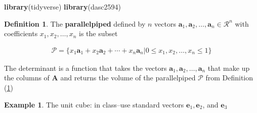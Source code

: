 \documentclass[
]{book}
\newenvironment{Shaded}{\begin{snugshade}}{\end{snugshade}}
\newcommand{\KeywordTok}[1]{\textcolor[rgb]{0.13,0.29,0.53}{\textbf{#1}}}
\newcommand{\NormalTok}[1]{#1}
\theoremstyle{definition}
\newtheorem{definition}{Definition}[chapter]
\theoremstyle{definition}
\newtheorem{example}{Example}[chapter]
\theoremstyle{definition}
\theoremstyle{definition}
\theoremstyle{remark}
\begin{document}
\begin{Shaded}
\begin{Highlighting}[]
\KeywordTok{library}\NormalTok{(tidyverse)}
\KeywordTok{library}\NormalTok{(dasc2594)}
\end{Highlighting}
\end{Shaded}

\begin{definition}
\protect\hypertarget{def:parallelpiped}{}\label{def:parallelpiped}The \textbf{parallelpiped} defined by \(n\) vectors \(\mathbf{a}_1, \mathbf{a}_2, \ldots, \mathbf{a}_n \in \mathcal{R}^n\) with coefficients \(x_1, x_2, \ldots, x_n\) is the subset

\[
\begin{aligned}
\mathcal{P} = \{x_1 \mathbf{a}_1 + x_2 \mathbf{a}_2 + \cdots + x_n \mathbf{a}_n | 0 \leq x_1, x_2, \ldots, x_n \leq 1 \}
\end{aligned}
\]
\end{definition}

The determinant is a function that takes the vectors \(\mathbf{a}_1, \mathbf{a}_2, \ldots, \mathbf{a}_n\) that make up the columns of \(\mathbf{A}\) and returns the volume of the parallelpiped \(\mathcal{P}\) from Definition (\ref{def:parallelpiped})

\begin{example}
The unit cube: in class--use standard vectors \(\mathbf{e}_1, \mathbf{e}_2\), and \(\mathbf{e}_3\)
\end{example}
\end{document}
